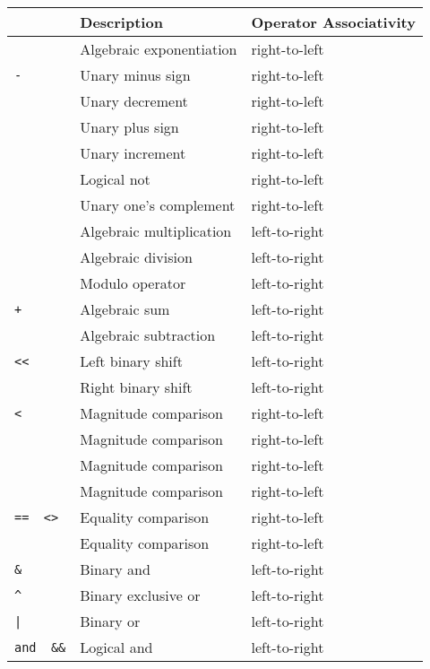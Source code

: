 \begin{table}
\begin{center}
\begin{tabular}{|>{\columncolor{LightGrey}}l>{\columncolor{LightGrey}}l>{\columncolor{LightGrey}}l|}
\hline
{\bf Symbol} & {\bf Description} & {\bf Operator Associativity} \\
\hline %
{\tt **} & Algebraic exponentiation & right-to-left \\
\hline %
{\tt -} & Unary minus sign & right-to-left \\
{\tt --} & Unary decrement & right-to-left \\
{\tt +} & Unary plus sign & right-to-left \\
{\tt ++} & Unary increment & right-to-left \\
{\tt not~~!} & Logical not & right-to-left \\
{\tt $\sim$} & Unary one's complement & right-to-left \\
\hline %
{\tt *} & Algebraic multiplication & left-to-right \\
{\tt /} & Algebraic division & left-to-right \\
{\tt \%} & Modulo operator & left-to-right \\
\hline %
{\tt +} & Algebraic sum & left-to-right \\
{\tt -} & Algebraic subtraction & left-to-right \\
\hline %
{\tt <<} & Left binary shift & left-to-right \\
{\tt >>} & Right binary shift & left-to-right \\
\hline %
{\tt <} & Magnitude comparison & right-to-left \\
{\tt >} & Magnitude comparison & right-to-left \\
{\tt <=} & Magnitude comparison & right-to-left \\
{\tt >=} & Magnitude comparison & right-to-left \\
\hline %
{\tt ==~~<>} & Equality comparison & right-to-left \\
{\tt !=} & Equality comparison & right-to-left \\
\hline %
{\tt \&} & Binary and & left-to-right \\
\hline %
{\tt \^{}} & Binary exclusive or & left-to-right \\
\hline %
{\tt |} & Binary or & left-to-right \\
\hline %
{\tt and~~\&\&} & Logical and & left-to-right \\

\end{tabular}
\end{center}
\end{table}
